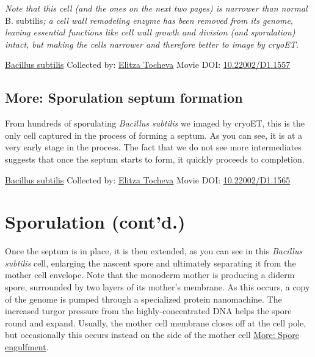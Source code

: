 \documentclass[]{tufte-book}
\begin{document}
\emph{Note that this cell (and the ones on the next two pages) is narrower than normal }B. subtilis\emph{; a cell wall remodeling enzyme has been removed from its genome, leaving essential functions like cell wall growth and division (and sporulation) intact, but making the cells narrower and therefore better to image by cryoET.}



\hypertarget{htmlwidget-3be2f6cc06491736c075}{}

\label{fig:8-5}\protect\hyperlink{tree}{Bacillus subtilis} Collected by: \protect\hyperlink{elitza_tocheva}{Elitza Tocheva} Movie DOI: \href{https://doi.org/10.22002/D1.1557}{10.22002/D1.1557}

\hypertarget{Sporulation_septum_formation}{%
\subsection*{More: Sporulation septum formation}\label{Sporulation_septum_formation}}

From hundreds of sporulating \emph{Bacillus subtilis} we imaged by cryoET, this is the only cell captured in the process of forming a septum. As you can see, it is at a very early stage in the process. The fact that we do not see more intermediates suggests that once the septum starts to form, it quickly proceeds to completion.



\hypertarget{htmlwidget-170c8e8da686c9c0ef3b}{}

\label{fig:8-5a}\protect\hyperlink{tree}{Bacillus subtilis} Collected by: \protect\hyperlink{elitza_tocheva}{Elitza Tocheva} Movie DOI: \href{https://doi.org/10.22002/D1.1565}{10.22002/D1.1565}

\hypertarget{sporulation-contd.}{%
\section{Sporulation (cont'd.)}\label{sporulation-contd.}}

Once the septum is in place, it is then extended, as you can see in this \emph{Bacillus subtilis} cell, enlarging the nascent spore and ultimately separating it from the mother cell envelope. Note that the monoderm mother is producing a diderm spore, surrounded by two layers of its mother's membrane. As this occurs, a copy of the genome is pumped through a specialized protein nanomachine. The increased turgor pressure from the highly-concentrated DNA helps the spore round and expand. Usually, the mother cell membrane closes off at the cell pole, but occasionally this occurs instead on the side of the mother cell \protect\hyperlink{Spore_engulfment}{More: Spore engulfment}.
\end{document}
